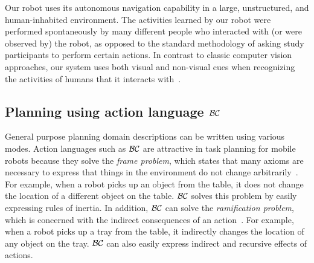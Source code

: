 Our robot uses its autonomous
navigation capability in a large, unstructured, and human-inhabited
environment.
The activities
learned by our robot were performed spontaneously by many different
people who interacted with (or were observed by) the robot, as opposed
to the standard methodology of asking study participants to perform
certain actions. 
In contrast to classic computer vision
approaches, our system uses both visual and non-visual cues when
recognizing the activities of humans that it interacts with~\cite{gori2015robot}.




\subsection{Planning using action language ${\cal BC}$}
General purpose planning domain descriptions can be written using
various modes. Action languages such as ${\cal BC}$ are attractive in
task planning for mobile robots because they solve the \emph{frame
problem}, which states that many axioms are necessary to express that
things in the environment do not change arbitrarily~\cite{mcc69}.
For example, when a robot picks up an object from the table, it does
not change the location of a different object on the table.  ${\cal
BC}$ solves this problem by easily expressing rules of inertia.  In
addition, ${\cal BC}$ can solve the \emph{ramification problem}, which
is concerned with the indirect consequences of an
action~\cite{fin86}.  For example, when a robot picks up a tray from
the table, it indirectly changes the location of any object on the
tray.  ${\cal BC}$ can also easily express indirect and recursive
effects of actions.



